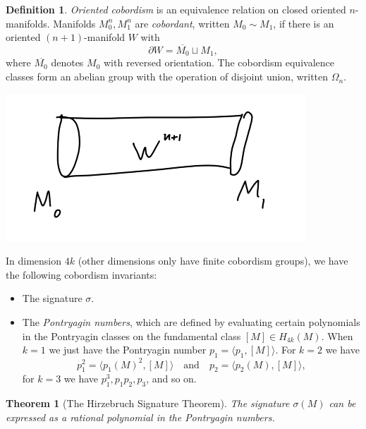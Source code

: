 \documentclass{article}
\newtheorem*{theorem}{Theorem}
\theoremstyle{definition}
\newtheorem*{definition}{Definition}
\begin{document}
\begin{definition}
    \emph{Oriented cobordism} is an equivalence relation on closed oriented
    $n$-manifolds. Manifolds $M_0^n,M_1^n$ are \emph{cobordant}, written
    $M_0\sim M_1$, if there is an oriented $(n+1)$-manifold $W$ with
    \begin{equation*}
        \partial W = \overline{M_0}\sqcup M_1,
    \end{equation*}
    where $\overline{M_0}$ denotes $M_0$ with reversed orientation. The
    cobordism equivalence classes form an abelian group with the operation of
    disjoint union, written $\Omega_n$.
    \begin{center}
        \includegraphics[scale=0.4]{manifolds_cobordism}
    \end{center}
\end{definition}

In dimension $4k$ (other dimensions only have finite cobordism groups), we have
the following cobordism invariants:
\begin{itemize}
    \item The signature $\sigma$.
    \item The \emph{Pontryagin numbers}, which are defined by evaluating certain
        polynomials in the Pontryagin classes on the fundamental class
        $[M]\in H_{4k}(M)$. When $k=1$ we just have the Pontryagin number
        $p_1=\langle p_1,[M]\rangle$. For $k=2$ we have
        \begin{equation*}
            p_1^2 = \langle p_1(M)^2,[M]\rangle \quad \text{and} \quad
            p_2 = \langle p_2(M),[M]\rangle,
        \end{equation*}
        for $k=3$ we have $p_1^3,p_1p_2,p_3$, and so on.
\end{itemize}

\begin{theorem}[The Hirzebruch Signature Theorem]
    The signature $\sigma(M)$ can be expressed as a rational polynomial in the
    Pontryagin numbers.
\end{theorem}
\end{document}
